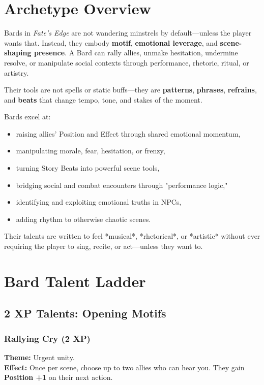 \documentclass[11pt]{book}
\begin{document}
\section{Archetype Overview}

Bards in \textit{Fate's Edge} are not wandering minstrels by default---unless the player wants that.
Instead, they embody \textbf{motif}, \textbf{emotional leverage}, and
\textbf{scene-shaping presence}. A Bard can rally allies, unmake hesitation,
undermine resolve, or manipulate social contexts through performance, rhetoric,
ritual, or artistry.

Their tools are not spells or static buffs---they are \textbf{patterns},
\textbf{phrases}, \textbf{refrains}, and \textbf{beats} that change tempo,
tone, and stakes of the moment.

Bards excel at:
\begin{itemize}
  \item raising allies' Position and Effect through shared emotional momentum,
  \item manipulating morale, fear, hesitation, or frenzy,
  \item turning Story Beats into powerful scene tools,
  \item bridging social and combat encounters through "performance logic,"
  \item identifying and exploiting emotional truths in NPCs,
  \item adding rhythm to otherwise chaotic scenes.
\end{itemize}

Their talents are written to feel *musical*, *rhetorical*, or *artistic* without ever requiring the player to sing, recite, or act---unless they want to.

\section{Bard Talent Ladder}

\subsection{2 XP Talents: Opening Motifs}

\subsubsection{Rallying Cry (2 XP)}
\textbf{Theme:} Urgent unity.\\
\textbf{Effect:} Once per scene, choose up to two allies who can hear you.
They gain \textbf{Position +1} on their next action.
\end{document}
